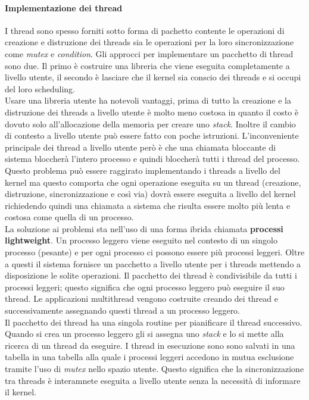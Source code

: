\paragraph{Implementazione dei thread}
I thread sono spesso forniti sotto forma di pachetto contente le operazioni di creazione e distruzione dei threads sia le operazioni per la loro sincronizzazione come \emph{mutex} e \emph{condition}. Gli approcci per implementare un pacchetto di thread sono due. Il primo è costruire una libreria che viene eseguita completamente a livello utente, il secondo è lasciare che il kernel sia conscio dei threads e si occupi del loro scheduling.\\
Usare una libreria utente ha notevoli vantaggi, prima di tutto la creazione e la distruzione dei threads a livello utente è molto meno costosa in quanto il costo è dovuto solo all'allocazione della memoria per creare uno \emph{stack}. Inoltre il cambio di contesto a livello utente può essere fatto con poche istruzioni. L'inconveniente principale dei thread a livello utente però è che una chiamata bloccante di sistema bloccherà l'intero processo e quindi bloccherà tutti i thread del processo.\\
Questo problema può essere raggirato implementando i threads a livello del kernel ma questo comporta che ogni operazione eseguita su un thread (creazione, distruzione, sincronizzazione e così via) dovrà essere eseguita a livello del kernel richiedendo quindi una chiamata a sistema che risulta essere molto più lenta e costosa come quella di un processo.\\
La soluzione ai problemi sta nell'uso di una forma ibrida chiamata \textbf{processi lightweight}. Un processo leggero viene eseguito nel contesto di un singolo processo (pesante) e per ogni processo ci possono essere più processi leggeri. Oltre a questi il sistema fornisce un pacchetto a livello utente per i threads mettendo a disposizione le solite operazioni. Il pacchetto dei thread è condivisibile da tutti i processi leggeri; questo significa che ogni processo leggero può eseguire il suo thread. Le applicazioni multithread vengono costruite creando dei thread e successivamente assegnando questi thread a un processo leggero.\\
Il pacchetto dei thread ha una singola routine per pianificare il thread successivo. Quando si crea un processo leggero gli si assegna uno \emph{stack} e lo si mette alla ricerca di un thread da eseguire. I thread in esecuzione sono sono salvati in una tabella in una tabella alla quale i processi leggeri accedono in mutua esclusione tramite l'uso di \emph{mutex} nello spazio utente. Questo significa che la sincronizzazione tra threads è interamnete eseguita a livello utente senza la necessità di informare il kernel. \\
